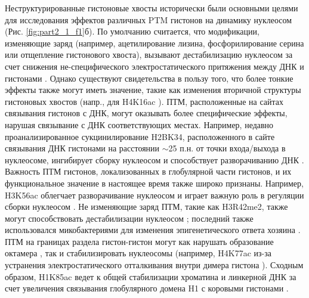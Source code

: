     Неструктурированные гистоновые хвосты исторически были основными целями для исследования эффектов различных PTM гистонов на динамику нуклеосом \cite{bowman_post-translational_2015} (Рис. \ref{fig:part2_1_f1}б). По умолчанию считается, что модификации, изменяющие заряд (например, ацетилирование лизина, фосфорилирование серина или отщепление гистонового хвоста), вызывают дестабилизацию нуклеосом за счет снижения не-специфического электростатического притяжения между ДНК и гистонами \cite{fenley_modulation_2018}. Однако существуют свидетельства в пользу того, что более тонкие эффекты также могут иметь значение, такие как изменения вторичной структуры гистоновых хвостов (напр., для H4K16ac \cite{potoyan_regulation_2012}). ПТМ, расположенные на сайтах связывания гистонов с ДНК, могут оказывать более специфические эффекты, нарушая связывание с ДНК соответствующих местах. Например, недавно проанализированное сукцинилирование H2BK34, расположенного в сайте связывания ДНК гистонами на расстоянии $\sim$25 п.н. от точки входа/выхода в нуклеосоме, ингибирует сборку нуклеосом и способствует разворачиванию ДНК \cite{jing_site-specific_2018}. Важность ПТМ гистонов, локализованных в глобулярной части гистонов, и их функциональное значение в настоящее время также широко признаны. Например, H3K56ac облегчает разворачивание нуклеосом и играет важную роль в регуляции сборки нуклеосом \cite{zhang_multisite_2018}. Не изменяющие заряд ПТМ, такие как H3R42me2, также могут способствовать дестабилизации нуклеосом \cite{casadio_h3r42me2a_2013}; последний также использовался микобактериями для изменения эпигенетического ответа хозяина \cite{yaseen_mycobacteria_2015}. ПТМ на границах раздела гистон-гистон могут как нарушать образование октамера \cite{ye_histone_2005}, так и стабилизировать нуклеосомы (например, H4K77ac из-за устранения электростатического отталкивания внутри димера гистона \cite{fenley_modulation_2018}). Сходным образом, H1K85ac ведет к общей стабилизации хроматина и линкерной ДНК за счет увеличения связывания глобулярного домена H1 с коровыми гистонами \cite{li_histone_2018}.

